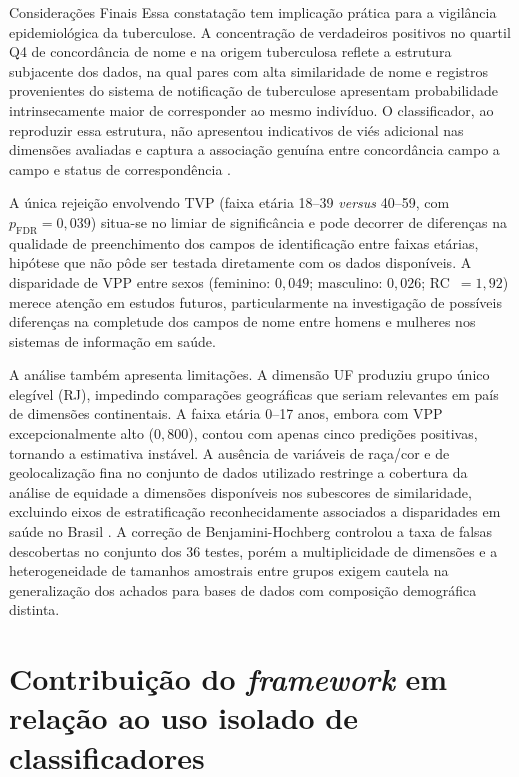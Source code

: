 \begin{chapter}{Considerações Finais}
Essa constatação tem implicação prática para a vigilância epidemiológica da tuberculose. A concentração de verdadeiros positivos no quartil Q4 de concordância de nome e na origem tuberculosa reflete a estrutura subjacente dos dados, na qual pares com alta similaridade de nome e registros provenientes do sistema de notificação de tuberculose apresentam probabilidade intrinsecamente maior de corresponder ao mesmo indivíduo.
O classificador, ao reproduzir essa estrutura, não apresentou indicativos de viés adicional nas dimensões avaliadas e captura a associação genuína entre concordância campo a campo e status de correspondência \cite{Fellegi1969theory,Christen2012book}.

A única rejeição envolvendo TVP (faixa etária 18--39 \textit{versus} 40--59, com $p_{\text{FDR}} = 0{,}039$) situa-se no limiar de significância e pode decorrer de diferenças na qualidade de preenchimento dos campos de identificação entre faixas etárias, hipótese que não pôde ser testada diretamente com os dados disponíveis.
A disparidade de VPP entre sexos (feminino: $0{,}049$; masculino: $0{,}026$; RC~$= 1{,}92$) merece atenção em estudos futuros, particularmente na investigação de possíveis diferenças na completude dos campos de nome entre homens e mulheres nos sistemas de informação em saúde.

A análise também apresenta limitações. A dimensão UF produziu grupo único elegível (RJ), impedindo comparações geográficas que seriam relevantes em país de dimensões continentais.
A faixa etária 0--17 anos, embora com VPP excepcionalmente alto ($0{,}800$), contou com apenas cinco predições positivas, tornando a estimativa instável.
A ausência de variáveis de raça/cor e de geolocalização fina no conjunto de dados utilizado restringe a cobertura da análise de equidade a dimensões disponíveis nos subescores de similaridade, excluindo eixos de estratificação reconhecidamente associados a disparidades em saúde no Brasil \cite{Mehrabi2021fairness}.
A correção de Benjamini-Hochberg \cite{Benjamini1995fdr} controlou a taxa de falsas descobertas no conjunto dos 36 testes, porém a multiplicidade de dimensões e a heterogeneidade de tamanhos amostrais entre grupos exigem cautela na generalização dos achados para bases de dados com composição demográfica distinta.

\section{Contribuição do \textit{framework} em relação ao uso isolado de classificadores}
\label{sec:cap6-contribuicao-framework}


\end{chapter}

